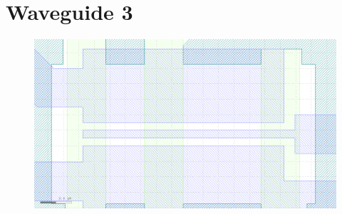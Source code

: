 \documentclass[a4paper]{article}
\begin{document}
\section{Waveguide 3}
\begin{figure}
\includegraphics[width=\textwidth]{figs/setups/wg3.png}
\end{figure}
\end{document}
